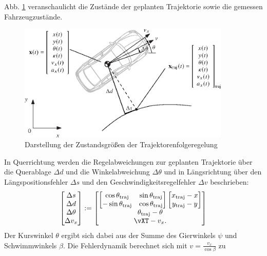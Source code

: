 Abb.  \ref{abb_zustaende_tfc} veranschaulicht die Zustände der geplanten Trajektorie sowie die gemessen Fahrzeugzustände.  
%
\begin{figure}[ht]
	\centering
	\includegraphics[width=0.9\textwidth]{Bilder/04/koordinaten_bahnfuehrung.eps}
	\caption{Darstellung der Zustandsgrößen der Trajektorenfolgeregelung}
	\label{abb_zustaende_tfc}
\end{figure}
%
In Querrichtung werden die Regelabweichungen zur geplanten Trajektorie über die Querablage $\Delta d$ und die Winkelabweichung $\Delta \theta$ und in Längsrichtung über den Längspositionsfehler $\Delta s$ und den Geschwindigkeitsregelfehler $\Delta v$ beschrieben:
\begin{equation}
\left[
\begin{matrix}
\Delta s \\ 
\Delta d \\ 
\Delta \theta \\ 
\Delta v_x
\end{matrix} 
\right]
:=
\left[
\begin{matrix}
\left[
\begin{matrix}
\cos \theta_\mathrm{traj} & \sin \theta_\mathrm{traj} \\ 
-\sin \theta_\mathrm{traj} & \cos \theta_\mathrm{traj} 
\end{matrix} 
\right]
\left[
\begin{matrix}
x_\mathrm{traj} -x\\ 
y_\mathrm{traj} -y
\end{matrix} 
\right]\\
\theta_\mathrm{traj} - \theta \\ 
\vXT- v_x.
\end{matrix} 
\right]
\label{eq_tfc_regelfehler}
\end{equation}
%
%
Der Kurswinkel $\theta$ ergibt sich dabei aus der Summe des Gierwinkels $\psi$ und Schwimmwinkels $\beta$.  Die Fehlerdynamik berechnet sich mit $v=\frac{v_x}{\cos{\beta}}$ zu
